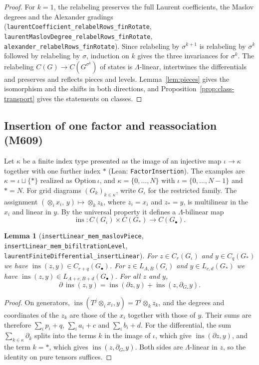 \documentclass[11pt]{amsart}
\newtheorem{lemma}[theorem]{Lemma}
\theoremstyle{definition}
\theoremstyle{remark}
\newcommand{\lean}[1]{\textnormal{\nolinkurl{#1}}}
\newcommand{\Lam}{\Lambda}
\newcommand{\Lev}{L}
\newcommand{\ins}{\operatorname{ins}}
\begin{document}
\begin{proof}
For $k=1$, the relabeling preserves the full Laurent coefficients, the Maslov degrees and the
Alexander gradings (\lean{laurentCoefficient_relabelRows_finRotate},
\lean{laurentMaslovDegree_relabelRows_finRotate}, \lean{alexander_relabelRows_finRotate}). Since
relabeling by $\sigma^{k+1}$ is relabeling by $\sigma^k$ followed by relabeling by $\sigma$, induction
on $k$ gives the three invariances for $\sigma^k$. The relabeling $C(G)\to C(G^{\sigma^k})$ of states
is $\Lam$-linear, intertwines the differentials and preserves and reflects pieces and levels.
Lemma~\ref{lem:pieces} gives the isomorphism and the shifts in both directions, and
Proposition~\ref{prop:class-transport} gives the statements on classes.
\end{proof}

\subsection{Insertion of one factor and reassociation (M609)}

Let $\kappa$ be a finite index type presented as the image of an injective map
$\iota\to\kappa$ together with one further index $*$ (Lean: \lean{FactorInsertion}). The examples
are $\kappa=\iota\sqcup\{*\}$ realized as $\mathrm{Option}\,\iota$, and $\kappa=\{0,\dots,N\}$ with
$\iota=\{0,\dots,N-1\}$ and $*=N$. For grid diagrams $(G_k)_{k\in\kappa}$, write $G_\iota$ for the
restricted family. The assignment $(\otimes_ix_i,\,y)\mapsto\otimes_kz_k$, where $z_i=x_i$ and
$z_*=y$, is multilinear in the $x_i$ and linear in $y$. By the universal property it defines a
$\Lam$-bilinear map
\[
\ins\colon C(G_\iota)\times C(G_*)\to C(G_\bullet).
\]

\begin{lemma}[\lean{insertLinear_mem_maslovPiece}, \lean{insertLinear_mem_bifiltrationLevel},
\lean{laurentFiniteDifferential_insertLinear}]\label{lem:insert}
For $z\in C_r(G_\iota)$ and $y\in C_q(G_*)$ we have $\ins(z,y)\in C_{r+q}(G_\bullet)$. For
$z\in\Lev_{A,B}(G_\iota)$ and $y\in\Lev_{c,d}(G_*)$ we have
$\ins(z,y)\in\Lev_{A+c,B+d}(G_\bullet)$. For all $z$ and $y$,
\[
\partial\,\ins(z,y)=\ins(\partial z,y)+\ins(z,\partial_{G_*}y).
\]
\end{lemma}

\begin{proof}
On generators, $\ins(T^j\otimes_ix_i,y)=T^j\otimes_kz_k$, and the degrees and coordinates of the
$z_k$ are those of the $x_i$ together with those of $y$. Their sums are therefore
$\sum_ip_i+q$, $\sum_ia_i+c$ and $\sum_ib_i+d$. For the differential, the sum
$\sum_{k\in\kappa}\partial_k$ splits into the terms $k$ in the image of $\iota$, which give
$\ins(\partial z,y)$, and the term $k=*$, which gives $\ins(z,\partial_{G_*}y)$. Both sides are
$\Lam$-linear in $z$, so the identity on pure tensors suffices.
\end{proof}
\end{document}
